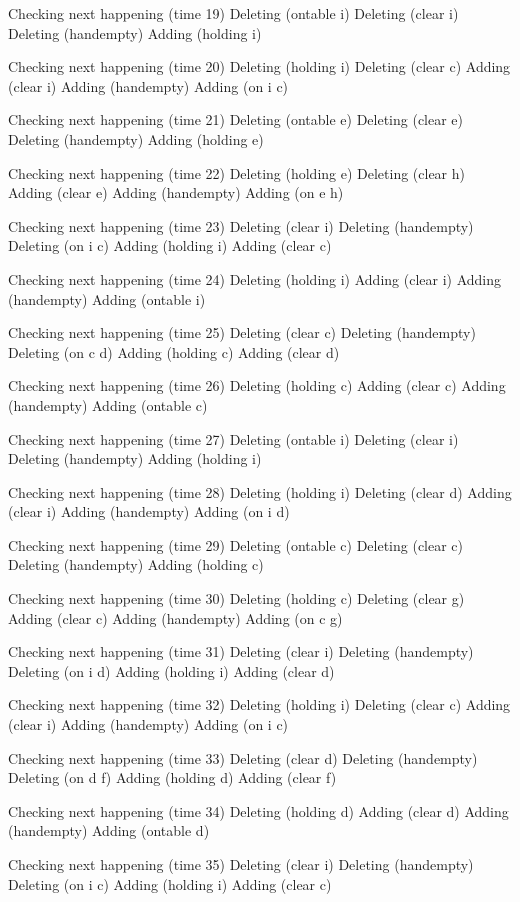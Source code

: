 Checking next happening (time 19)
Deleting (ontable i)
Deleting (clear i)
Deleting (handempty)
Adding (holding i)

Checking next happening (time 20)
Deleting (holding i)
Deleting (clear c)
Adding (clear i)
Adding (handempty)
Adding (on i c)

Checking next happening (time 21)
Deleting (ontable e)
Deleting (clear e)
Deleting (handempty)
Adding (holding e)

Checking next happening (time 22)
Deleting (holding e)
Deleting (clear h)
Adding (clear e)
Adding (handempty)
Adding (on e h)

Checking next happening (time 23)
Deleting (clear i)
Deleting (handempty)
Deleting (on i c)
Adding (holding i)
Adding (clear c)

Checking next happening (time 24)
Deleting (holding i)
Adding (clear i)
Adding (handempty)
Adding (ontable i)

Checking next happening (time 25)
Deleting (clear c)
Deleting (handempty)
Deleting (on c d)
Adding (holding c)
Adding (clear d)

Checking next happening (time 26)
Deleting (holding c)
Adding (clear c)
Adding (handempty)
Adding (ontable c)

Checking next happening (time 27)
Deleting (ontable i)
Deleting (clear i)
Deleting (handempty)
Adding (holding i)

Checking next happening (time 28)
Deleting (holding i)
Deleting (clear d)
Adding (clear i)
Adding (handempty)
Adding (on i d)

Checking next happening (time 29)
Deleting (ontable c)
Deleting (clear c)
Deleting (handempty)
Adding (holding c)

Checking next happening (time 30)
Deleting (holding c)
Deleting (clear g)
Adding (clear c)
Adding (handempty)
Adding (on c g)

Checking next happening (time 31)
Deleting (clear i)
Deleting (handempty)
Deleting (on i d)
Adding (holding i)
Adding (clear d)

Checking next happening (time 32)
Deleting (holding i)
Deleting (clear c)
Adding (clear i)
Adding (handempty)
Adding (on i c)

Checking next happening (time 33)
Deleting (clear d)
Deleting (handempty)
Deleting (on d f)
Adding (holding d)
Adding (clear f)

Checking next happening (time 34)
Deleting (holding d)
Adding (clear d)
Adding (handempty)
Adding (ontable d)

Checking next happening (time 35)
Deleting (clear i)
Deleting (handempty)
Deleting (on i c)
Adding (holding i)
Adding (clear c)

